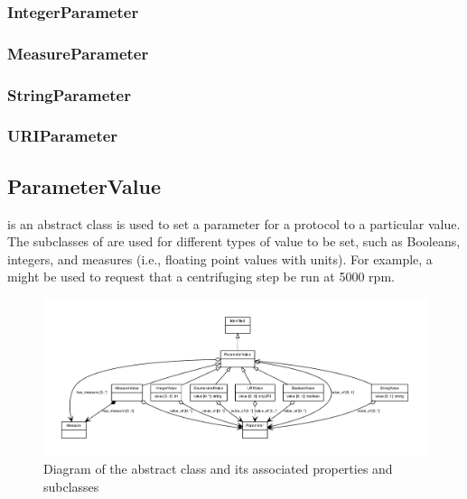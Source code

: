 \subsubsection{IntegerParameter}
\label{sec:IntegerParameter}

\subsubsection{MeasureParameter}
\label{sec:MeasureParameter}

\subsubsection{StringParameter}
\label{sec:StringParameter}


\subsubsection{URIParameter}
\label{sec:URIParameter}



\subsection{ParameterValue}
\label{sec:ParameterValue}

 is an abstract class is used to set a parameter for a protocol to a particular value. 
The subclasses of  are used for different types of value to be set, such as Booleans, integers, and measures (i.e., floating point values with units).
For example, a  might be used to request that a centrifuging step be run at 5000 rpm.

\begin{figure}[ht]
\begin{center}
\includegraphics[scale=0.6]{figures/ParameterValue_definition_and_abstraction}
\caption[]{Diagram of the  abstract class and its associated properties and subclasses}
\label{uml:ParameterValue}
\end{center}
\end{figure}


